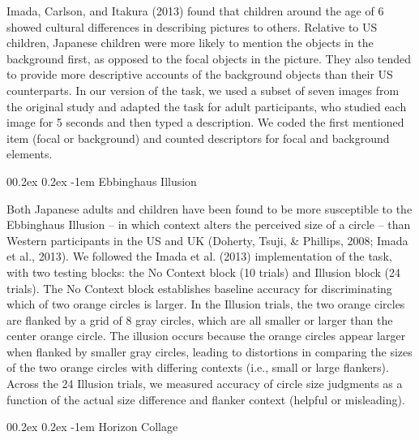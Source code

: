 \documentclass[
  man,floatsintext]{apa6}
\makeatletter
\let\oldparagraph\paragraph
\renewcommand{\paragraph}[1]{\oldparagraph{#1}\mbox{}}
\renewcommand{\paragraph}{\@startsection{paragraph}{4}{\parindent}%
  {0\baselineskip \@plus 0.2ex \@minus 0.2ex}%
  {-1em}%
  {\normalfont\normalsize\bfseries\itshape\typesectitle}}
\makeatother
\begin{document}
Imada, Carlson, and Itakura (2013) found that children around the age of 6 showed cultural differences in describing pictures to others. Relative to US children, Japanese children were more likely to mention the objects in the background first, as opposed to the focal objects in the picture. They also tended to provide more descriptive accounts of the background objects than their US counterparts. In our version of the task, we used a subset of seven images from the original study and adapted the task for adult participants, who studied each image for 5 seconds and then typed a description. We coded the first mentioned item (focal or background) and counted descriptors for focal and background elements.

\hypertarget{ebbinghaus-illusion}{%
\paragraph{Ebbinghaus Illusion}\label{ebbinghaus-illusion}}

Both Japanese adults and children have been found to be more susceptible to the Ebbinghaus Illusion -- in which context alters the perceived size of a circle -- than Western participants in the US and UK (Doherty, Tsuji, \& Phillips, 2008; Imada et al., 2013). We followed the Imada et al. (2013) implementation of the task, with two testing blocks: the No Context block (10 trials) and Illusion block (24 trials). The No Context block establishes baseline accuracy for discriminating which of two orange circles is larger. In the Illusion trials, the two orange circles are flanked by a grid of 8 gray circles, which are all smaller or larger than the center orange circle. The illusion occurs because the orange circles appear larger when flanked by smaller gray circles, leading to distortions in comparing the sizes of the two orange circles with differing contexts (i.e., small or large flankers). Across the 24 Illusion trials, we measured accuracy of circle size judgments as a function of the actual size difference and flanker context (helpful or misleading).

\hypertarget{horizon-collage}{%
\paragraph{Horizon Collage}\label{horizon-collage}}
\end{document}
